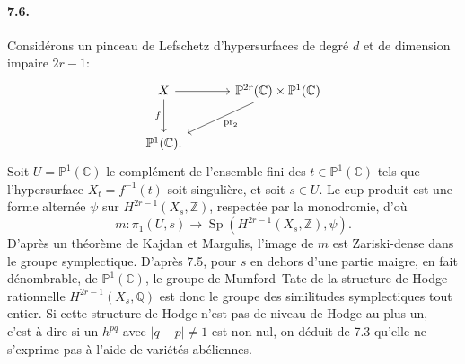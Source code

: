 \documentclass[10pt]{article}
\newcommand{\C}{\mathbb{C}}
\newcommand{\Q}{\mathbb{Q}}
\newcommand{\Z}{\mathbb{Z}}
\providecommand{\Sp}{\operatorname{Sp}}
\providecommand{\pr}{\operatorname{pr}}
\begin{document}
\paragraph{7.6.} Considérons un pinceau de Lefschetz d'hypersurfaces de degré $d$ et de dimension impaire $2r-1$:
\[
\begin{tikzcd}[column sep=3.4em,row sep=2.4em]
X \arrow[r] \arrow[d,"f"'] & \mathbb P^{2r}(\C)\times\mathbb P^1(\C) \arrow[dl,"\pr_2"]\\
\mathbb P^1(\C).&
\end{tikzcd}
\]
Soit $U=\mathbb P^1(\C)$ le complément de l'ensemble fini des $t\in\mathbb P^1(\C)$ tels que l'hypersurface $X_t=f^{-1}(t)$ soit singulière, et soit $s\in U$. Le cup-produit est une forme alternée $\psi$ sur $H^{2r-1}(X_s,\Z)$, respectée par la monodromie, d'où
\[
m:\pi_1(U,s)\longrightarrow \Sp(H^{2r-1}(X_s,\Z),\psi).
\]
D'après un théorème de Kajdan et Margulis, l'image de $m$ est Zariski-dense dans le groupe symplectique. D'après 7.5, pour $s$ en dehors d'une partie maigre, en fait dénombrable, de $\mathbb P^1(\C)$, le groupe de Mumford--Tate de la structure de Hodge rationnelle $H^{2r-1}(X_s,\Q)$ est donc le groupe des similitudes symplectiques tout entier. Si cette structure de Hodge n'est pas de niveau de Hodge au plus un, c'est-à-dire si un $h^{pq}$ avec $|q-p|\ne1$ est non nul, on déduit de 7.3 qu'elle ne s'exprime pas à l'aide de variétés abéliennes.
\end{document}
